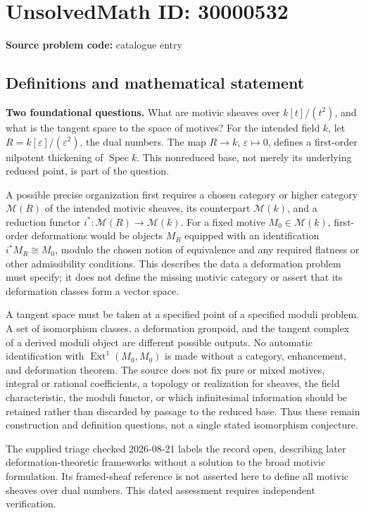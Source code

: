 \documentclass[11pt]{article}
\begin{document}
\section*{UnsolvedMath ID: 30000532}
\textbf{Source problem code:} catalogue entry
\subsection{Definitions and mathematical statement}
\textbf{Two foundational questions.} What are motivic sheaves over \(k[t]/(t^2)\), and what is the tangent space to the space of motives? For the intended field \(k\), let \(R=k[\varepsilon]/(\varepsilon^2)\), the dual numbers. The map \(R\to k\), \(\varepsilon\mapsto0\), defines a first-order nilpotent thickening of \(\operatorname{Spec}k\). This nonreduced base, not merely its underlying reduced point, is part of the question.\par A possible precise organization first requires a chosen category or higher category \(\mathcal M(R)\) of the intended motivic sheaves, its counterpart \(\mathcal M(k)\), and a reduction functor \(i^*:\mathcal M(R)\to\mathcal M(k)\). For a fixed motive \(M_0\in\mathcal M(k)\), first-order deformations would be objects \(M_R\) equipped with an identification \(i^*M_R\cong M_0\), modulo the chosen notion of equivalence and any required flatness or other admissibility conditions. This describes the data a deformation problem must specify; it does not define the missing motivic category or assert that its deformation classes form a vector space.\par A tangent space must be taken at a specified point of a specified moduli problem. A set of isomorphism classes, a deformation groupoid, and the tangent complex of a derived moduli object are different possible outputs. No automatic identification with \(\operatorname{Ext}^1(M_0,M_0)\) is made without a category, enhancement, and deformation theorem. The source does not fix pure or mixed motives, integral or rational coefficients, a topology or realization for sheaves, the field characteristic, the moduli functor, or which infinitesimal information should be retained rather than discarded by passage to the reduced base. Thus these remain construction and definition questions, not a single stated isomorphism conjecture.\par The supplied triage checked 2026-08-21 labels the record open, describing later deformation-theoretic frameworks without a solution to the broad motivic formulation. Its framed-sheaf reference is not asserted here to define all motivic sheaves over dual numbers. This dated assessment requires independent verification.
\end{document}
